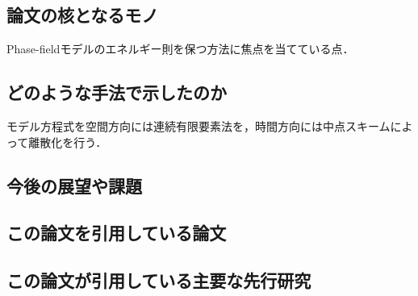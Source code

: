 \documentclass[openary, a4paper, oneside]{jsarticle}
\begin{document}
  \subsection{論文の核となるモノ}
  Phase-fieldモデルのエネルギー則を保つ方法に焦点を当てている点．
  \subsection{どのような手法で示したのか}
  モデル方程式を空間方向には連続有限要素法を，時間方向には中点スキームによって離散化を行う．
  \subsection{今後の展望や課題}
  \subsection{この論文を引用している論文}
  \subsection{この論文が引用している主要な先行研究}


\newpage

\end{document}
